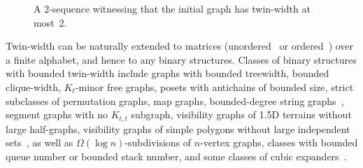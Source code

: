 \documentclass[a4paper,UKenglish,cleveref,hyperref,autoref]{lipics-v2021}
\begin{document}
\begin{figure}[h!]
{
  }
  \caption{A 2-sequence witnessing that the initial graph has twin-width at most~2.}
  \label{fig:contraction-sequence}
\end{figure}
Twin-width can be naturally extended to matrices (unordered~\cite{twin-width1} or ordered~\cite{twin-width4}) over a finite alphabet, and hence to any binary structures. 
Classes of binary structures with bounded twin-width include graphs with bounded treewidth, bounded clique-width, $K_t$-minor free graphs, posets with antichains of bounded size, strict subclasses of permutation graphs, map graphs, bounded-degree string graphs~\cite{twin-width1}, segment graphs with no $K_{t,t}$ subgraph, visibility graphs of 1.5D terrains without large half-graphs, visibility graphs of simple polygons without large independent sets~\cite{twin-width8}, as well as $\Omega(\log n)$-subdivisions of $n$-vertex graphs, classes with bounded queue number or bounded stack number, and some classes of cubic expanders~\cite{twin-width2}.
\end{document}
